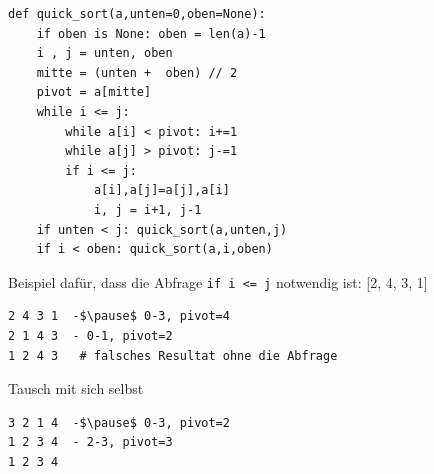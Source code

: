 \documentclass{beamer}
\begin{document}
\begin{frame}[fragile]
\begin{lstlisting} 
def quick_sort(a,unten=0,oben=None):
    if oben is None: oben = len(a)-1
    i , j = unten, oben
    mitte = (unten +  oben) // 2
    pivot = a[mitte]
    while i <= j:
        while a[i] < pivot: i+=1
        while a[j] > pivot: j-=1
        if i <= j:
            a[i],a[j]=a[j],a[i]
            i, j = i+1, j-1
    if unten < j: quick_sort(a,unten,j)
    if i < oben: quick_sort(a,i,oben)
\end{lstlisting} 
\end{frame}

\begin{frame}[fragile]

Beispiel dafür, dass die Abfrage \texttt{if i <= j} notwendig ist: [2, 4, 3, 1]  \pause
\begin{lstlisting} 
2 4 3 1  -$\pause$ 0-3, pivot=4
2 1 4 3  - 0-1, pivot=2
1 2 4 3   # falsches Resultat ohne die Abfrage
\end{lstlisting}  \pause

Tausch mit sich selbst
\begin{lstlisting} 
3 2 1 4  -$\pause$ 0-3, pivot=2
1 2 3 4  - 2-3, pivot=3
1 2 3 4
\end{lstlisting} 
\end{frame}


 
\end{document}
